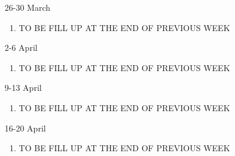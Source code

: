 \documentclass{article}
\begin{document}
\begin{enumerate}
\item [26-30 March]
\begin{enumerate}
\item TO BE FILL UP AT THE END OF PREVIOUS WEEK
\end{enumerate}

\item [2-6 April]
\begin{enumerate}
\item TO BE FILL UP AT THE END OF PREVIOUS WEEK
\end{enumerate}

\item [9-13 April]
\begin{enumerate}
\item TO BE FILL UP AT THE END OF PREVIOUS WEEK
\end{enumerate}

\item [16-20 April]
\begin{enumerate}
\item TO BE FILL UP AT THE END OF PREVIOUS WEEK
\end{enumerate}

\end{enumerate}
\end{document}
